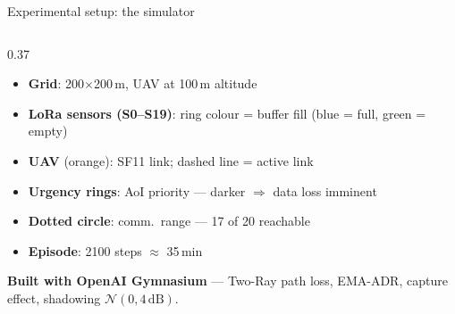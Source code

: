 \documentclass[aspectratio=169,11pt]{beamer}
\newcommand{\emp}[1]{{\color{manpurple}\textbf{#1}}}
\newcommand{\qt}[1]{{\color{muted}#1}}
\begin{document}
\begin{frame}[t]{Experimental setup: the simulator}
\begin{columns}[T]
\begin{column}{0.37\textwidth}
      \begin{itemize}\setlength\itemsep{0.12em}
        \item \emp{Grid}: 200$\times$200\,m, UAV at 100\,m altitude
        \item \emp{LoRa sensors (S0--S19)}: ring colour = buffer fill \qt{(blue = full, green = empty)}
        \item \emp{UAV} \qt{(orange)}: SF11 link; dashed line = active link
        \item \emp{Urgency rings}: AoI priority — darker $\Rightarrow$ data loss imminent
        \item \emp{Dotted circle}: comm.\ range — 17 of 20 reachable
        \item \emp{Episode}: 2100 steps $\approx$ 35\,min
      \end{itemize}
      \vspace{0.3em}
      \begin{block}{}
        \scriptsize
        \emp{Built with OpenAI Gymnasium} — Two-Ray path loss, EMA-ADR, capture effect, shadowing $\mathcal{N}(0,4\,\mathrm{dB})$.
      \end{block}
    \end{column}
  \end{columns}
\end{frame}
\end{document}
